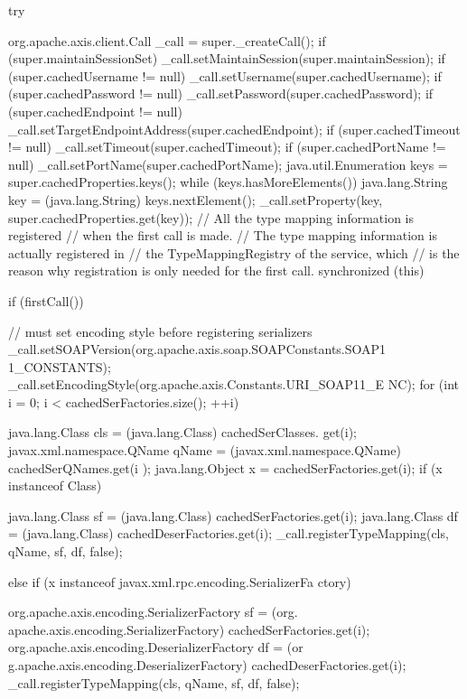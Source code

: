 \begin{DoxyCode}
            {
        try {
            org.apache.axis.client.Call _call = super._createCall();
            if (super.maintainSessionSet) {
                _call.setMaintainSession(super.maintainSession);
            }
            if (super.cachedUsername != null) {
                _call.setUsername(super.cachedUsername);
            }
            if (super.cachedPassword != null) {
                _call.setPassword(super.cachedPassword);
            }
            if (super.cachedEndpoint != null) {
                _call.setTargetEndpointAddress(super.cachedEndpoint);
            }
            if (super.cachedTimeout != null) {
                _call.setTimeout(super.cachedTimeout);
            }
            if (super.cachedPortName != null) {
                _call.setPortName(super.cachedPortName);
            }
            java.util.Enumeration keys = super.cachedProperties.keys();
            while (keys.hasMoreElements()) {
                java.lang.String key = (java.lang.String) keys.nextElement();
                _call.setProperty(key, super.cachedProperties.get(key));
            }
            // All the type mapping information is registered
            // when the first call is made.
            // The type mapping information is actually registered in
            // the TypeMappingRegistry of the service, which
            // is the reason why registration is only needed for the first call.
            synchronized (this) {
                if (firstCall()) {
                    // must set encoding style before registering serializers
                    _call.setSOAPVersion(org.apache.axis.soap.SOAPConstants.SOAP1
      1_CONSTANTS);
                    _call.setEncodingStyle(org.apache.axis.Constants.URI_SOAP11_E
      NC);
                    for (int i = 0; i < cachedSerFactories.size(); ++i) {
                        java.lang.Class cls = (java.lang.Class) cachedSerClasses.
      get(i);
                        javax.xml.namespace.QName qName =
                                (javax.xml.namespace.QName) cachedSerQNames.get(i
      );
                        java.lang.Object x = cachedSerFactories.get(i);
                        if (x instanceof Class) {
                            java.lang.Class sf = (java.lang.Class)
                                 cachedSerFactories.get(i);
                            java.lang.Class df = (java.lang.Class)
                                 cachedDeserFactories.get(i);
                            _call.registerTypeMapping(cls, qName, sf, df, false);
      
                        }
                        else if (x instanceof javax.xml.rpc.encoding.SerializerFa
      ctory) {
                            org.apache.axis.encoding.SerializerFactory sf = (org.
      apache.axis.encoding.SerializerFactory)
                                 cachedSerFactories.get(i);
                            org.apache.axis.encoding.DeserializerFactory df = (or
      g.apache.axis.encoding.DeserializerFactory)
                                 cachedDeserFactories.get(i);
                            _call.registerTypeMapping(cls, qName, sf, df, false);
      
}}}}}}
\end{DoxyCode}
